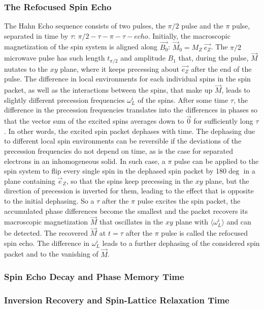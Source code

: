 \subsubsection{The Refocused Spin Echo}
The Hahn Echo sequence consists of two pulses, the $\pi/2$ pulse and the $\pi$ pulse, separated in time by $\tau$: $\pi/2 - \tau - \pi - \tau - echo$. Initially, the macroscopic magnetization of the spin system is aligned along $\vec{B_0}$: $\vec{M}_0=M_Z~\vec{e_Z}$. The $\pi/2$ microwave pulse has such length $t_{\pi/2}$ and amplitude $B_1$ that, during the pulse, $\vec{M}$ nutates to the $xy$ plane, where it keeps precessing about $\vec{e_Z}$ after the end of the pulse. The difference in local environments for each individual spins in the spin packet, as well as the interactions between the spins, that make up $\vec{M}$, leads to slightly different precession frequencies $\omega_L^i$ of the spins. After some time $\tau$, the difference in the precession frequencies translates into the differences in phases so that the vector sum of the excited spins averages down to $\vec{0}$ for sufficiently long $\tau$. In other words, the excited spin packet dephases with time. The dephasing due to different local spin environments can be reversible if the deviations of the precession frequencies do not depend on time, as is the case for separated electrons in an inhomogeneous solid. In such case, a $\pi$ pulse can be applied to the spin system to flip every single spin in the dephased spin packet by 180$\deg$ in a plane containing $\vec{e}_Z$, so that the spins keep precessing in the $xy$ plane, but the direction of precession is inverted for them, leading to the effect that is opposite to the initial dephasing. So a $\tau$ after the $\pi$ pulse excites the spin packet, the accumulated phase differences become the smallest and the packet recovers its macroscopic magnetization $\vec{M}$ that oscillates in the $xy$ plane with $\langle\omega_L^i\rangle$ and can be detected. The recovered $\vec{M}$ at $t=\tau$ after the $\pi$ pulse is called the refocused spin echo. The difference in $\omega_L^i$ leads to a further dephasing of the considered spin packet and to the vanishing of $\vec{M}$.\\
\subsubsection{Spin Echo Decay and Phase Memory Time}
\subsubsection{Inversion Recovery and Spin-Lattice Relaxation Time}

